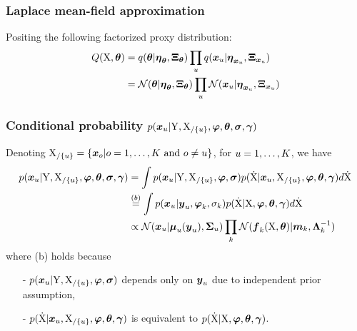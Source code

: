 \begin{frame}[t]
    \frametitle{Laplace mean-field approximation}
    Positing the following factorized proxy distribution:
    \begin{align}
        Q(\mathrm{X},\boldsymbol{\theta}) 
        & = 
        q(\boldsymbol{\theta}\vert\boldsymbol{\eta}_{\boldsymbol{\theta}},\boldsymbol{\Xi}_{\boldsymbol{\theta}})
        \prod_u{
            q(\boldsymbol{x}_{u}\vert\boldsymbol{\eta}_{\boldsymbol{x}_{u}},\boldsymbol{\Xi}_{\boldsymbol{x}_{u}})}
        \nonumber
        \\
        & = \mathcal{N}(\boldsymbol{\theta}\vert\boldsymbol{\eta}_{\boldsymbol{\theta}}, \boldsymbol{\Xi}_{\boldsymbol{\theta}})
        \prod_u{
            \mathcal{N}(\boldsymbol{x}_{u}\vert\boldsymbol{\eta}_{\boldsymbol{x}_{u}},\boldsymbol{\Xi}_{\boldsymbol{x}_{u}})
        }
    \end{align}
\end{frame}

\begin{frame}[t]
    \frametitle{Conditional probability $p(\boldsymbol{x}_{u}\vert\mathrm{Y},\mathrm{X}_{/\{u\}},\boldsymbol{\varphi},\boldsymbol{\theta},\boldsymbol{\sigma},\boldsymbol{\gamma})$}
    Denoting $\mathrm{X}_{/\{u\}} = \{\boldsymbol{x}_{o}\vert o = 1,\dots,K\ \text{and}\ o \neq u \}$, for $u = 1,\dots,K$, we have
    \begin{align} 
        p(\boldsymbol{x}_{u}\vert\mathrm{Y},\mathrm{X}_{/\{u\}},\boldsymbol{\varphi},\boldsymbol{\theta},\boldsymbol{\sigma},\boldsymbol{\gamma})       
        & =     
        \int{
            p(\boldsymbol{x}_{u}\vert\mathrm{Y},\mathrm{X}_{/\{u\}},\boldsymbol{\ensuremath{\varphi}},\boldsymbol{\sigma}) p(\mathrm{\dot{X}}\vert\boldsymbol{x}_{u},\mathrm{X}_{/\{u\}},\boldsymbol{\ensuremath{\varphi}},\boldsymbol{\theta},\boldsymbol{\gamma}) d\mathrm{\dot{X}}}
        \nonumber
        \\
        & \stackrel{(b)}{=}         
        \int{
            p(\boldsymbol{x}_{u}\vert\boldsymbol{y}_{u},\boldsymbol{\ensuremath{\varphi}}_{k},\sigma_{k}) p(\mathrm{\dot{X}}\vert\mathrm{X},\boldsymbol{\ensuremath{\varphi}},\boldsymbol{\theta},\boldsymbol{\gamma}) d\mathrm{\dot{X}}}
        \nonumber
        \\             
        & \propto
        \mathcal{N}(\boldsymbol{x}_{u}\vert\boldsymbol{\mu}_{u}(\boldsymbol{y}_{u}),\boldsymbol{\Sigma}_{u})\prod_k{\mathcal{N}(\boldsymbol{f}_{k}(\mathrm{X}, \boldsymbol{\theta})\vert\boldsymbol{m}_{k},\boldsymbol{\Lambda}_{k}^{-1})}
        \label{eq-laplace-xu-objective}
    \end{align}
    where (b) holds because 
    \begin{itemize}
        \item[-] $p(\boldsymbol{x}_{u}\vert\mathrm{Y},\mathrm{X}_{/\{u\}},\boldsymbol{\varphi},\boldsymbol{\sigma})$ depends only on $\boldsymbol{y}_{u}$ due to independent prior assumption,
        \item[-] $p(\mathrm{\dot{X}}\vert\boldsymbol{x}_{u},\mathrm{X}_{/\{u\}},\boldsymbol{\varphi},\boldsymbol{\theta},\boldsymbol{\gamma})$ is equivalent to $p(\mathrm{\dot{X}}\vert\mathrm{X},\boldsymbol{\varphi},\boldsymbol{\theta},\boldsymbol{\gamma})$.
    \end{itemize}
\end{frame}

